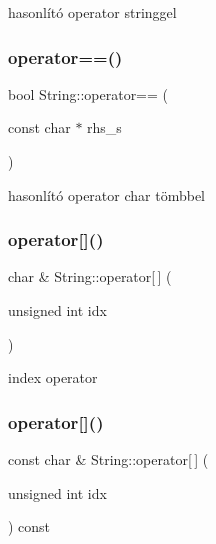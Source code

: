 hasonlító operator stringgel 

\mbox{\label{class_string_ade9af860a809548214837e33367e8835}} 
\subsubsection{\texorpdfstring{operator==()}{operator==()}\hspace{0.1cm}{\footnotesize\ttfamily [2/2]}}
{\footnotesize\ttfamily bool String\+::operator== (\begin{DoxyParamCaption}\item[{const char $\ast$}]{rhs\+\_\+s }\end{DoxyParamCaption})}



hasonlító operator char tömbbel 

\mbox{\label{class_string_a1a7c5c39d4dafbbf8516f5058a253f1a}} 
\subsubsection{\texorpdfstring{operator[]()}{operator[]()}\hspace{0.1cm}{\footnotesize\ttfamily [1/2]}}
{\footnotesize\ttfamily char \& String\+::operator\mbox{[}$\,$\mbox{]} (\begin{DoxyParamCaption}\item[{unsigned int}]{idx }\end{DoxyParamCaption})}



index operator 

\mbox{\label{class_string_aaa249e62641872197679cfc7c66118c0}} 
\subsubsection{\texorpdfstring{operator[]()}{operator[]()}\hspace{0.1cm}{\footnotesize\ttfamily [2/2]}}
{\footnotesize\ttfamily const char \& String\+::operator\mbox{[}$\,$\mbox{]} (\begin{DoxyParamCaption}\item[{unsigned int}]{idx }\end{DoxyParamCaption}) const}



